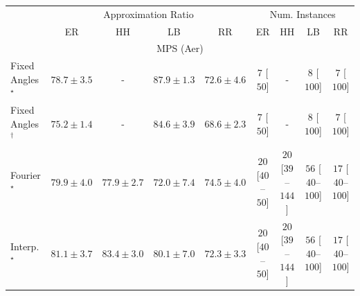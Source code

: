 \begin{tabular}{l|cccc|cccc|}
\toprule
& \multicolumn{4}{c|}{Approximation Ratio} & \multicolumn{4}{c|}{Num. Instances} \\
            & ER & HH & LB & RR & ER & HH & LB & RR \\
\midrule
\multicolumn{9}{c}{\rule{0pt}{8pt}MPS (Aer)} \\
\midrule
Fixed Angles$^\star$ & {\cellcolor[HTML]{8B61AC}} \color[HTML]{F1F1F1} $78.7\pm 3.5$ & {\cellcolor[HTML]{000000}} \color[HTML]{F1F1F1} {\cellcolor{white}} \color{black} - & {\cellcolor[HTML]{760C71}} \color[HTML]{F1F1F1} $87.9\pm 1.3$ & {\cellcolor[HTML]{8D98C7}} \color[HTML]{F1F1F1} $72.6\pm 4.6$ & {\cellcolor[HTML]{FFF7F3}} \color[HTML]{000000} $7$ [$50$] & {\cellcolor[HTML]{000000}} \color[HTML]{F1F1F1} {\cellcolor{white}} \color{black} - & {\cellcolor[HTML]{FFF7F3}} \color[HTML]{000000} $8$ [$100$] & {\cellcolor[HTML]{FFF7F3}} \color[HTML]{000000} $7$ [$100$] \\
Fixed Angles$^\dagger$ & {\cellcolor[HTML]{8C80BB}} \color[HTML]{F1F1F1} $75.2\pm 1.4$ & {\cellcolor[HTML]{000000}} \color[HTML]{F1F1F1} {\cellcolor{white}} \color{black} - & {\cellcolor[HTML]{84278C}} \color[HTML]{F1F1F1} $84.6\pm 3.9$ & {\cellcolor[HTML]{9DB9D9}} \color[HTML]{000000} $68.6\pm 2.3$ & {\cellcolor[HTML]{FFF7F3}} \color[HTML]{000000} $7$ [$50$] & {\cellcolor[HTML]{000000}} \color[HTML]{F1F1F1} {\cellcolor{white}} \color{black} - & {\cellcolor[HTML]{FFF7F3}} \color[HTML]{000000} $8$ [$100$] & {\cellcolor[HTML]{FFF7F3}} \color[HTML]{000000} $7$ [$100$] \\
Fourier$^\star$ & {\cellcolor[HTML]{8A55A7}} \color[HTML]{F1F1F1} $79.9\pm 4.0$ & {\cellcolor[HTML]{8C68AF}} \color[HTML]{F1F1F1} $77.9\pm 2.7$ & {\cellcolor[HTML]{8F9DC9}} \color[HTML]{F1F1F1} $72.0\pm 7.4$ & {\cellcolor[HTML]{8C86BE}} \color[HTML]{F1F1F1} $74.5\pm 4.0$ & {\cellcolor[HTML]{FFF4F0}} \color[HTML]{000000} $20$ [$40$--$50$] & {\cellcolor[HTML]{FFF4F0}} \color[HTML]{000000} $20$ [$39$--$144$] & {\cellcolor[HTML]{FEECE9}} \color[HTML]{000000} $56$ [$40$--$100$] & {\cellcolor[HTML]{FFF5F1}} \color[HTML]{000000} $17$ [$40$--$100$] \\
Interp.$^\star$ & {\cellcolor[HTML]{894BA2}} \color[HTML]{F1F1F1} $81.1\pm 3.7$ & {\cellcolor[HTML]{863394}} \color[HTML]{F1F1F1} $83.4\pm 3.0$ & {\cellcolor[HTML]{8A54A6}} \color[HTML]{F1F1F1} $80.1\pm 7.0$ & {\cellcolor[HTML]{8E9AC8}} \color[HTML]{F1F1F1} $72.3\pm 3.3$ & {\cellcolor[HTML]{FFF4F0}} \color[HTML]{000000} $20$ [$40$--$50$] & {\cellcolor[HTML]{FFF4F0}} \color[HTML]{000000} $20$ [$39$--$144$] & {\cellcolor[HTML]{FEECE9}} \color[HTML]{000000} $56$ [$40$--$100$] & {\cellcolor[HTML]{FFF5F1}} \color[HTML]{000000} $17$ [$40$--$100$] \\

\end{tabular}
